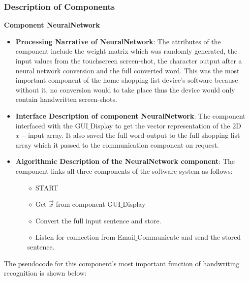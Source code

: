 \subsubsection{Description of Components}
\textbf{Component NeuralNetwork}
\begin{itemize}
	\item \textbf{Processing Narrative of NeuralNetwork}: The attributes of the component include the weight matrix which was randomly generated, the input values from the touchscreen screen-shot, the character output after a neural network conversion and the full converted word. This was the most important component of the  home shopping list device's software because without it, no conversion would to take place thus the device would only contain handwritten screen-shots.
	\item \textbf{Interface Description of component NeuralNetwork}: The component interfaced with the GUI$\_$Display to get the vector representation of the 2D $x-$input array. It also saved the full word output to the full shopping list array which it passed to the communication component on request.
	\item \textbf{Algorithmic Description of the NeuralNetwork component}: The component links all three components of the software system as follows:\\
	\begin{itemize}
		\item[$\diamond$]	START
		\item[$\diamond$]	Get $\vec{x}$ from component GUI$\_$Display
		\item[$\diamond$]	Convert the full input sentence and store.
		\item[$\diamond$]	Listen for connection from Email$\_$Communicate and send the stored sentence. 
	\end{itemize}
\end{itemize}
The pseudocode for this component's most important function of handwriting recognition is shown below:
